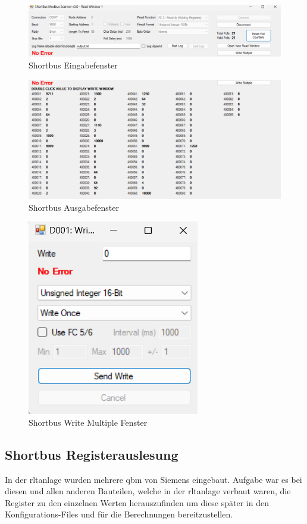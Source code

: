 \begin{figure}[H]
	\centering
	\includegraphics[width=1\linewidth]{Bilder/shortbus_eingabe}
	\caption{Shortbus Eingabefenster} 
	\label{fig:Shortbuseingabe}
\end{figure}


\begin{figure}[H]
	\centering
	\includegraphics[width=1\linewidth]{Bilder/shortbus_ausgabe}
	\caption{Shortbus Ausgabefenster} 
	\label{fig:Shortbusausgabe}
\end{figure}

\begin{figure}[H]
	\centering
	\includegraphics[width=0.3\linewidth]{Bilder/write_multiple_fenster}
	\caption{Shortbus Write Multiple Fenster} 
	\label{fig:writemultiple}
\end{figure}

\subsection{Shortbus Registerauslesung}

In der \ac{rltanlage} wurden mehrere \gls{qbm} von Siemens eingebaut. Aufgabe war es bei diesen und allen anderen Bauteilen, welche in der \ac{rltanlage} verbaut waren, die Register zu den einzelnen Werten herauszufinden um diese später in den Konfigurations-Files und für die Berechnungen bereitzustellen. 

